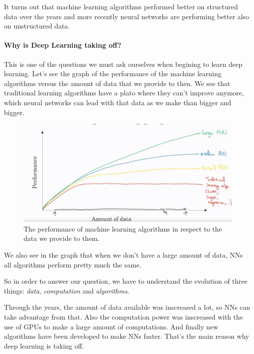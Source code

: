 \documentclass[12pt, a4paper, oneside]{book}
\begin{document}
It turns out that machine learning algorithms performed better on structured
data over the years and more recently neural networks are performing better also
on unstructured data.

\paragraph{Why is Deep Learning taking off?}%
\label{par:why_is_deep_learning_taking_off_}

This is one of the questions we must ask ourselves when begining to learn deep
learning. Let's see the graph of the performance of the machine learning
algorithms versus the amount of data that we provide to then. We see that
traditional learning algorithms have a plato where they can't improve anymore,
which neural networks can lead with that data as we make than bigger and bigger.

\begin{figure}[h]
\centering
\includegraphics[scale=0.4]{Res/ml_algorithms_performance.png}
\caption{The performance of machine learning algorithms in respect to the data
we provide to them.}
\label{ml_algorithms_performance.png}
\end{figure}

We also see in the graph that when we don't have a large amount of data, NNs
all algorithms perform pretty much the same.

So in order to answer our question, we have to understand the evolution of three
things: \textit{data}, \textit{computation} and \textit{algorithms}.

Through the years, the amount of data available was inscreased a lot, so NNs can
take advantage from that. Also the computation power was inscreased with the use
of GPUs to make a large amount of computations. And finally new algorithms have
been developed to make NNs faster. That's the main reason why deep learning is
taking off.
\end{document}
